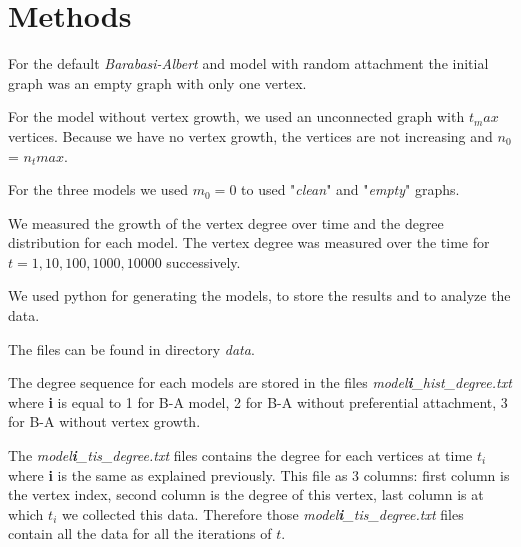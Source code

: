 \documentclass{article}
\begin{document}
\section*{Methods} \label{methods}

For the default \textit{Barabasi-Albert} and model with random attachment the 
initial graph was an empty graph with only one vertex.

For the model without vertex growth, we used an unconnected graph with $t_max$ 
vertices. Because we have no vertex growth, the vertices are not increasing and 
$n_0$ = $n_tmax$.

For the three models we used $m_0 = 0$ to used "\textit{clean}" and 
"\textit{empty}" graphs.

We measured the growth of the vertex degree over time and the degree 
distribution for each model. The vertex degree was measured over the time for $t 
= 1, 10, 100, 1000, 10000$ successively.

We used python for generating the models, to store the results and to analyze 
the data.

The files can be found in directory \textit{data}.

The degree sequence for each models are stored in the files 
\textit{model\textbf{i}\_hist\_degree.txt} where \textbf{i} is equal to 1 for 
B-A model, 2 for B-A without preferential attachment, 3 for B-A without vertex 
growth.

The \textit{model\textbf{i}\_tis\_degree.txt} files contains the degree for each 
vertices at time $t_i$ where \textbf{i} is the same as explained previously. 
This file as 3 columns: first column is the vertex index, second column is the 
degree of this vertex, last column is at which $t_i$ we collected this data. 
Therefore those \textit{model\textbf{i}\_tis\_degree.txt} files contain all the 
data for all the iterations of $t$.
\end{document}
